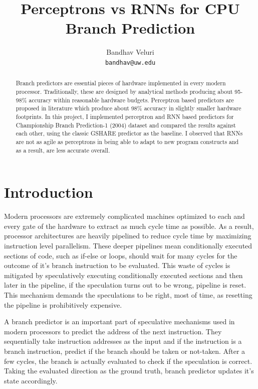 \documentclass{article}
\title{Perceptrons vs RNNs for CPU Branch Prediction}
\author{%
  Bandhav Veluri\\
  \texttt{bandhav@uw.edu} \\
}
\begin{document}

\maketitle

\begin{abstract}
Branch predictors are essential pieces of hardware implemented in every modern processor. Traditionally, these are designed by analytical methods producing about 95-98\% accuracy within reasonable hardware budgets. Perceptron based predictors are proposed in literature which produce about 98\% accuracy in slightly smaller hardware footprints. In this project, I implemented perceptron and RNN based predictors for Championship Branch Prediction-1 (2004) dataset and compared the results against each other, using the classic GSHARE predictor as the baseline. I observed that RNNs are not as agile as perceptrons in being able to adapt to new program constructs and as a result, are less accurate overall.
\end{abstract}

\section{Introduction}

Modern processors are extremely complicated machines optimized to each and every gate of the hardware to extract as much cycle time as possible. As a result, processor architectures are heavily pipelined to reduce cycle time by maximizing instruction level parallelism. These deeper pipelines mean conditionally executed sections of code, such as if-else or loops, should wait for many cycles for the outcome of it's branch instruction to be evaluated. This waste of cycles is mitigated by speculatively executing conditionally executed sections and then later in the pipeline, if the speculation turns out to be wrong, pipeline is reset. This mechanism demands the speculations to be right, most of time, as resetting the pipeline is prohibitively expensive.

A branch predictor is an important part of speculative mechanisms used in modern processors to predict the address of the next instruction. They sequentially take instruction addresses as the input and if the instruction is a branch instruction, predict if the branch should be taken or not-taken. After a few cycles, the branch is actually evaluated to check if the speculation is correct. Taking the evaluated direction as the ground truth, branch predictor updates it's state accordingly.
\end{document}
